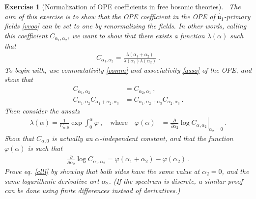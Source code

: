 \documentclass[12pt,a4paper,notitlepage]{report}
\numberwithin{equation}{section}
\theoremstyle{break}
\newtheorem{exo}{Exercise}[chapter]
\begin{document}
\begin{exo}[Normalization of OPE coefficients in free bosonic theories]
 ~\label{exoone}
The aim of this exercise is to show that the OPE coefficient in the OPE of $\hat{\mathfrak{u}}_1$-primary fields \eqref{vvoo} can be set to one by renormalizing the fields.
In other words, calling this coefficient $C_{\alpha_1,\alpha_2}$, we want to show that there exists a function $\lambda(\alpha)$ such that 
\begin{align}
 C_{\alpha_1,\alpha_2} = \frac{\lambda(\alpha_1+\alpha_2)}{\lambda(\alpha_1)\lambda(\alpha_2)}\ .
\label{clll}
\end{align}
To begin with, 
use commutativity \eqref{comm} and associativity \eqref{asso} of the OPE, and show that 
\begin{align}
C_{\alpha_1,\alpha_2} &= C_{\alpha_2,\alpha_1}\ ,
\\
 C_{\alpha_1,\alpha_2}C_{\alpha_1+\alpha_2,\alpha_3} &= C_{\alpha_1,\alpha_2+\alpha_3}C_{\alpha_2,\alpha_3}\ .
\end{align}
Then consider the ansatz
\begin{align}
  \lambda(\alpha) = \frac{1}{C_{\alpha,0}} \exp \int_0^{\alpha} \varphi \ , \quad \text{where}\quad  
 \varphi(\alpha)&=\left.{\frac{\partial}{\partial \alpha_2}}\log C_{\alpha,\alpha_2}\right|_{\alpha_2=0}\ .
\end{align}
Show that $C_{\alpha,0}$ is actually an $\alpha$-independent constant, and that the function $\varphi(\alpha)$ is such that
\begin{align}
 {\frac{\partial}{\partial \alpha_2}} \log C_{\alpha_1,\alpha_2}  = \varphi(\alpha_1+\alpha_2)-\varphi(\alpha_2)\ . 
\end{align}
Prove eq. \eqref{clll} by showing that both sides have the same value at $\alpha_2=0$, and the same logarithmic derivative wrt $\alpha_2$. 
(If the spectrum is discrete, a similar proof can be done using finite differences instead of derivatives.) 
\end{exo}
\end{document}

